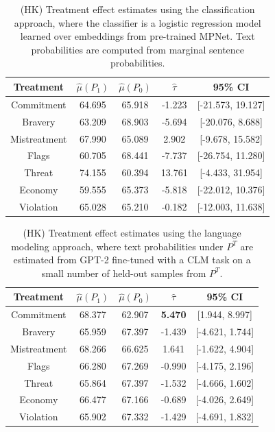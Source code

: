 \documentclass{article}
\begin{document}
\begin{table}[!ht]
    \centering
    \begin{tabular}{c|cccc}
        \toprule
        Treatment & $\hat{\mu}(P_1)$ & $\hat{\mu}(P_0)$ & $\hat{\tau}$ & 95\% CI \\
        \midrule
        Commitment & 64.695 & 65.918 & \textcolor{red!80!black}{-1.223} & [-21.573, 19.127] \\
        Bravery & 63.209 & 68.903 & \textcolor{red!80!black}{-5.694} & [-20.076, 8.688] \\
        Mistreatment & 67.990 & 65.089 & \textcolor{green!50!black}{2.902} & [-9.678, 15.582] \\
        Flags & 60.705 & 68.441 & \textcolor{red!80!black}{-7.737} & [-26.754, 11.280] \\
        Threat & 74.155 & 60.394 & \textcolor{green!50!black}{13.761} & [-4.433, 31.954] \\
        Economy & 59.555 & 65.373 & \textcolor{red!80!black}{-5.818} & [-22.012, 10.376] \\
        Violation & 65.028 & 65.210 & \textcolor{red!80!black}{-0.182} & [-12.003, 11.638] \\
        \bottomrule
    \end{tabular}
    \caption{(HK) Treatment effect estimates using the classification approach, where the classifier is a logistic regression model learned over embeddings from pre-trained MPNet. Text probabilities are computed from marginal sentence probabilities.}
    \label{tab:results_clf2_old}
\end{table}

\begin{table}[!ht]
    \centering
    \begin{tabular}{c|cccc}
        \toprule
        Treatment & $\hat{\mu}(P_1)$ & $\hat{\mu}(P_0)$ & $\hat{\tau}$ & 95\% CI \\
        \midrule
        Commitment & 68.377 & 62.907 & \textbf{\textcolor{green!50!black}{5.470}} & [1.944, 8.997] \\
        Bravery & 65.959 & 67.397 & \textcolor{red!80!black}{-1.439} & [-4.621, 1.744] \\
        Mistreatment & 68.266 & 66.625 & \textcolor{green!50!black}{1.641} & [-1.622, 4.904] \\
        Flags & 66.280 & 67.269 & \textcolor{red!80!black}{-0.990} & [-4.175, 2.196] \\
        Threat & 65.864 & 67.397 & \textcolor{red!80!black}{-1.532} & [-4.666, 1.602] \\
        Economy & 66.477 & 67.166 & \textcolor{red!80!black}{-0.689} & [-4.026, 2.649] \\
        Violation & 65.902 & 67.332 & \textcolor{red!80!black}{-1.429} & [-4.691, 1.832] \\
        \bottomrule
    \end{tabular}
    \caption{(HK) Treatment effect estimates using the language modeling approach, where text probabilities under $P^T$ are estimated from GPT-2 fine-tuned with a CLM task on a small number of held-out samples from $P^T$.}
    \label{tab:results_lm2_old}
\end{table}
\end{document}
